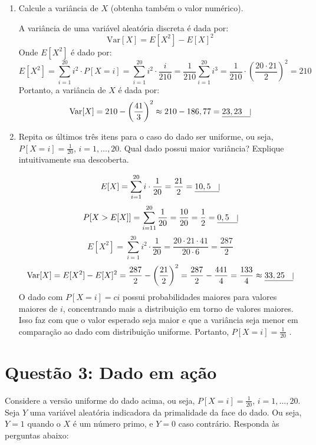 \documentclass[12 pt]{article}
\begin{document}
\begin{enumerate}
\begin{tcolorbox}[colframe=black, title=Resposta:]
    \end{tcolorbox}
    \item Calcule a variância de $X$ (obtenha também o valor numérico).
    \begin{tcolorbox}[colframe=black, title=Resposta:]
        A variância de uma variável aleatória discreta é dada por:
        $$\text{Var}[X] = E[X^2] - E[X]^2$$
        Onde $E[X^2]$ é dado por:
        $$E[X^2] = \sum_{i=1}^{20} i^2 \cdot P [X = i] = \sum_{i=1}^{20} i^2 \cdot \frac{i}{210} = \frac{1}{210} \sum_{i=1}^{20} i^3 = \frac{1}{210} \cdot \left(\frac{20 \cdot 21}{2}\right)^2 = 210$$
        Portanto, a variância de $X$ é dada por:
        $$\text{Var}[X] = 210 - \left(\frac{41}{3}\right)^2 \approx 210 - 186,77 = \underline{23,23 \quad \vline}$$
    \end{tcolorbox}
    \newpage
    \item Repita os últimos três itens para o caso do dado ser uniforme, ou seja, $P [X = i] = \frac{1}{20}$, $i = 1, \dots, 20$. Qual dado possui maior variância? Explique intuitivamente sua descoberta.
    \begin{tcolorbox}[colframe=black, title=Resposta:]
        $$E[X] = \sum_{i=1}^{20} i \cdot \frac{1}{20} = \frac{21}{2} = \underline{10,5 \quad \vline}$$
        $$P [X > E[X]] = \sum_{i=11}^{20} \frac{1}{20} = \frac{10}{20} = \frac{1}{2} = \underline{0,5 \quad \vline}$$
        $$E[X^2] = \sum_{i=1}^{20} i^2 \cdot \frac{1}{20} = \frac{20 \cdot 21 \cdot 41}{20 \cdot 6} = \frac{287}{2}$$
        $$\text{Var}[X] = E[X^2] - E[X]^2 = \frac{287}{2} - \left(\frac{21}{2}\right)^2 = \frac{287}{2} - \frac{441}{4} = \frac{133}{4} \approx \underline{33,25 \quad \vline}$$
        O dado com $P[X = i] = ci$ possui probabilidades maiores para valores maiores de $i$, concentrando mais a distribuição em torno de valores maiores. Isso faz com que o valor esperado seja maior e que a variância seja menor em comparação ao dado com distribuição uniforme. Portanto,  $P[X = i] = \frac{1}{20}$ .
    \end{tcolorbox}
\end{enumerate}

\section*{Questão 3: Dado em ação}
Considere a versão uniforme do dado acima, ou seja, $P [X = i] = \frac{1}{20}$, $i = 1, \dots, 20$. Seja $Y$ uma variável
aleatória indicadora da primalidade da face do dado. Ou seja, $Y = 1$ quando o $X$ é um número primo,
e $Y = 0$ caso contrário. Responda às perguntas abaixo:
\end{document}
